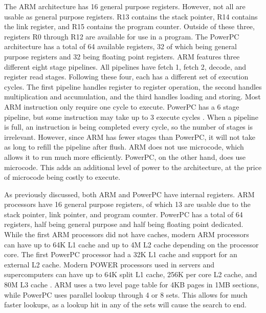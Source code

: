 \documentclass[letterpaper,10pt,onecolumn,titlepage]{article}
\begin{document}
\par
The ARM architecture has 16 general purpose registers. However, not all are usable as
general purpose registers. R13 contains the stack pointer, R14 contains the link register,
and R15 contains the program counter. Outside of these three, registers R0 through R12 are
available for use in a program. The PowerPC architecture has a total of 64 available
registers, 32 of which being general purpose registers and 32 being floating point
registers. ARM features three different eight stage pipelines. All pipelines have fetch 1, 
fetch 2, decode, and register read stages. Following these four, each has a different set 
of execution cycles. The first pipeline handles register to register operation, the second
handles multiplication and accumulation, and the third handles loading and storing. Most 
ARM instruction only require one cycle to execute. PowerPC has a 6 stage 
pipeline, but some instruction may take up to 3 execute cycles \cite{Abramson}. When a pipeline is 
full, an instruction is being completed every cycle, so the number of stages is irrelevant.
However, since ARM has fewer stages than PowerPC, it will not take as long to refill the
pipeline after flush. ARM does not use microcode, which allows it to run much more
efficiently. PowerPC, on the other hand, does use microcode. This adds an additional level
of power to the architecture, at the price of microcode being costly to execute.

\par
As previously discussed, both ARM and PowerPC have internal registers. ARM processors have
16 general purpose registers, of which 13 are usable due to the stack pointer, link
pointer, and program counter. PowerPC has a total of 64 registers, half being general
purpose and half being floating point dedicated. While the first ARM processors did not
have caches, modern ARM processors can have up to 64K L1 cache and up to 4M L2 cache
depending on the processor core. The first PowerPC processor had a 32K L1 cache and
support for an external L2 cache. Modern POWER processors used in servers and
supercomputers can have up to 64K split L1 cache, 256K per core L2 cache, and 80M L3
cache \cite{IBM}. ARM uses a two level page table for 4KB pages in 1MB sections, while PowerPC 
uses parallel lookup through 4 or 8 sets. This allows for much faster lookups, as a lookup
hit in any of the sets will cause the search to end.
\end{document}
